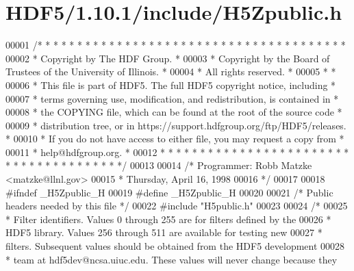 \hypertarget{_h_d_f5_21_810_81_2include_2_h5_zpublic_8h_source}{}\section{H\+D\+F5/1.10.1/include/\+H5\+Zpublic.h}
\label{_h_d_f5_21_810_81_2include_2_h5_zpublic_8h_source}

\begin{DoxyCode}
00001 \textcolor{comment}{/* * * * * * * * * * * * * * * * * * * * * * * * * * * * * * * * * * * * * * *}
00002 \textcolor{comment}{ * Copyright by The HDF Group.                                               *}
00003 \textcolor{comment}{ * Copyright by the Board of Trustees of the University of Illinois.         *}
00004 \textcolor{comment}{ * All rights reserved.                                                      *}
00005 \textcolor{comment}{ *                                                                           *}
00006 \textcolor{comment}{ * This file is part of HDF5.  The full HDF5 copyright notice, including     *}
00007 \textcolor{comment}{ * terms governing use, modification, and redistribution, is contained in    *}
00008 \textcolor{comment}{ * the COPYING file, which can be found at the root of the source code       *}
00009 \textcolor{comment}{ * distribution tree, or in https://support.hdfgroup.org/ftp/HDF5/releases.  *}
00010 \textcolor{comment}{ * If you do not have access to either file, you may request a copy from     *}
00011 \textcolor{comment}{ * help@hdfgroup.org.                                                        *}
00012 \textcolor{comment}{ * * * * * * * * * * * * * * * * * * * * * * * * * * * * * * * * * * * * * * */}
00013 
00014 \textcolor{comment}{/* Programmer:  Robb Matzke <matzke@llnl.gov>}
00015 \textcolor{comment}{ *              Thursday, April 16, 1998}
00016 \textcolor{comment}{ */}
00017 
00018 \textcolor{preprocessor}{#ifndef \_H5Zpublic\_H}
00019 \textcolor{preprocessor}{#define \_H5Zpublic\_H}
00020 
00021 \textcolor{comment}{/* Public headers needed by this file */}
00022 \textcolor{preprocessor}{#include "H5public.h"}
00023 
00024 \textcolor{comment}{/*}
00025 \textcolor{comment}{ * Filter identifiers.  Values 0 through 255 are for filters defined by the}
00026 \textcolor{comment}{ * HDF5 library.  Values 256 through 511 are available for testing new}
00027 \textcolor{comment}{ * filters. Subsequent values should be obtained from the HDF5 development}
00028 \textcolor{comment}{ * team at hdf5dev@ncsa.uiuc.edu.  These values will never change because they}

\end{DoxyCode}
